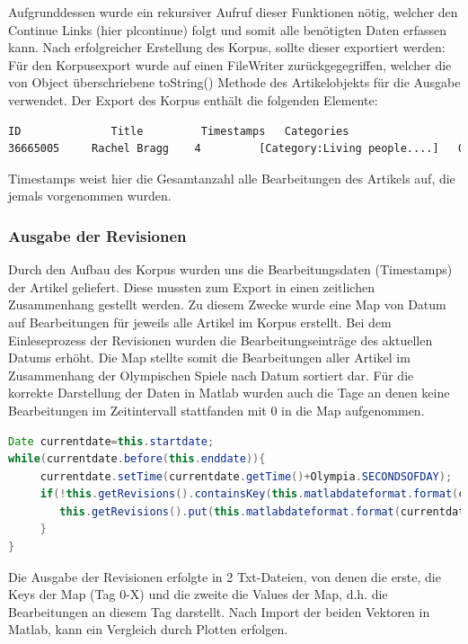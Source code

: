 \documentclass[pagesize=auto, titlepage=on]{scrartcl}
\begin{document}
Aufgrunddessen wurde ein rekursiver Aufruf dieser Funktionen nötig, welcher den Continue Links (hier plcontinue) folgt und somit alle benötigten Daten erfassen kann.
Nach erfolgreicher Erstellung des Korpus, sollte dieser exportiert werden:\\
Für den Korpusexport wurde auf einen FileWriter zurückgegegriffen, welcher die von Object überschriebene toString() Methode des Artikelobjekts für die Ausgabe verwendet. Der Export des Korpus enthält die folgenden Elemente:
\begin{lstlisting}[language=XML]
ID              Title         Timestamps   Categories                    Subarticles         Links
36665005     Rachel Bragg    4         [Category:Living people....]   0                   [Volleyball....]
\end{lstlisting}
Timestamps weist hier die Gesamtanzahl alle Bearbeitungen des Artikels auf, die jemals vorgenommen wurden.
\subsubsection{Ausgabe der Revisionen}
Durch den Aufbau des Korpus wurden uns die Bearbeitungsdaten (Timestamps) der Artikel geliefert. Diese mussten zum Export in einen zeitlichen Zusammenhang gestellt werden. Zu diesem Zwecke wurde eine Map von Datum auf Bearbeitungen für jeweils alle Artikel im Korpus erstellt. Bei dem Einleseprozess der Revisionen wurden die Bearbeitungseinträge des aktuellen Datums erhöht.
Die Map stellte somit die Bearbeitungen aller Artikel im Zusammenhang der Olympischen Spiele nach Datum sortiert dar. Für die korrekte Darstellung der Daten in Matlab wurden auch die Tage an denen keine Bearbeitungen im Zeitintervall stattfanden mit 0 in die Map aufgenommen.
\begin{lstlisting}[language=Java]Date currentdate=this.startdate;
while(currentdate.before(this.enddate)){
     currentdate.setTime(currentdate.getTime()+Olympia.SECONDSOFDAY);
     if(!this.getRevisions().containsKey(this.matlabdateformat.format(currentdate))){
        this.getRevisions().put(this.matlabdateformat.format(currentdate),0);
     }
}\end{lstlisting}
Die Ausgabe der Revisionen erfolgte in 2 Txt-Dateien, von denen die erste, die Keys der Map (Tag 0-X) und die zweite die Values der Map, d.h. die Bearbeitungen an diesem Tag darstellt. Nach Import der beiden Vektoren in Matlab, kann ein Vergleich durch Plotten erfolgen.
\end{document}
